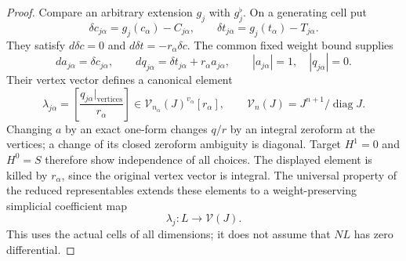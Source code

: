 \begin{proof}
Compare an arbitrary extension \(g_j\) with \(g_j^\flat\).
On a generating cell put
\[
 \delta c_{j\alpha}=g_j(c_\alpha)-C_{j\alpha},\qquad
 \delta t_{j\alpha}=g_j(t_\alpha)-T_{j\alpha}.
                                                               \tag{136.OG8}
\]
They satisfy \(d\delta c=0\) and
\(d\delta t=-r_\alpha\delta c\).  The common fixed
weight bound supplies
\[
 da_{j\alpha}=\delta c_{j\alpha},\qquad
 dq_{j\alpha}=\delta t_{j\alpha}+r_\alpha a_{j\alpha},
             \qquad |a_{j\alpha}|=1,\quad |q_{j\alpha}|=0.
                                                               \tag{136.OG9}
\]
Their vertex vector defines a canonical element
\[
 \lambda_{j\alpha}
       =\left[\frac{q_{j\alpha}|_{\mathrm{vertices}}}{r_\alpha}\right]
       \in\mathcal V_{n_\alpha}(J)^{v_\alpha}[r_\alpha],
             \qquad \mathcal V_n(J)=J^{n+1}/\operatorname{diag}J.
                                                               \tag{136.OG10}
\]
Changing \(a\) by an exact one-form changes \(q/r\)
by an integral zeroform at the vertices; a change of its
closed zeroform ambiguity is diagonal.  Target \(H^1=0\)
and \(H^0=S\) therefore show independence of all choices.
The displayed element is killed by \(r_\alpha\), since
the original vertex vector is integral.  The universal property
of the reduced representables extends these elements to a
weight-preserving simplicial coefficient map
\[
                            \lambda_j:L\longrightarrow\mathcal V(J).
                                                               \tag{136.OG11}
\]
This uses the actual cells of all dimensions; it does not
assume that \(NL\) has zero differential.


\end{proof}

